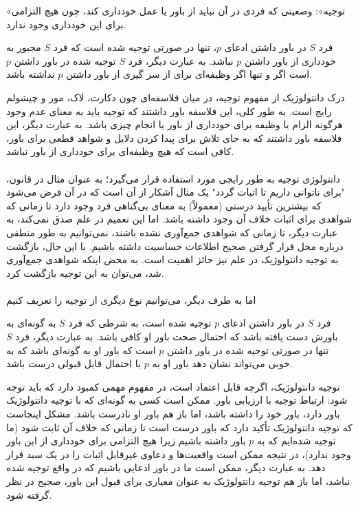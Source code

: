\documentclass[10pt,a4paper]{article}
\begin{document}
«توجیه»: وضعیتی که فردی در آن نباید از باور یا عمل خودداری کند، چون هیچ التزامی برای این خودداری وجود ندارد.
                    \begin{define}
                        فرد $S$ در باور داشتن ادعای $p$، تنها در صورتی توجیه شده است که فرد $S$ مجبور به خودداری از باور داشتن $p$ نباشد. به عبارت دیگر، فرد $S$ توجیه شده در باور داشتن $p$ است اگر و تنها اگر وظیفه‌ای برای از سر گیری از باور داشتن $p$ نداشته باشد.
                    \end{define}
                   درک دانتولوژیک از مفهوم توجیه، در میان فلاسفه‌ای چون دکارت، لاک، مور و چیشولم رایج است. به طور کلی، این فلاسفه باور داشتند که توجیه باید به معنای عدم وجود هرگونه الزام یا وظیفه برای خودداری از باور یا انجام چیزی باشد. به عبارت دیگر، این فلاسفه باور داشتند که به جای تلاش برای پیدا کردن دلایل و شواهد قطعی برای باور، کافی است که هیچ وظیفه‌ای برای خودداری از باور نباشد.
                    \\
                    \\
                   دانتولوژی توجیه به طور رایجی مورد استفاده قرار می‌گیرد؛ به عنوان مثال در قانون، "برای ناتوانی داریم تا اثبات گردد" یک مثال آشکار از آن است که در آن فرض می‌شود که بیشترین تأیید درستی (معمولاً) به معنای بی‌گناهی فرد وجود دارد تا زمانی که شواهدی برای اثبات خلاف آن وجود داشته باشد. اما این تعمیم در علم صدق نمی‌کند، به عبارت دیگر، تا زمانی که شواهدی جمع‌آوری نشده باشند، نمی‌توانیم به طور منطقی درباره محل قرار گرفتن صحیح اطلاعات حساسیت داشته باشیم. با این حال، بازگشت به توجیه دانتولوژیک در علم نیز حائز اهمیت است. به محض اینکه شواهدی جمع‌آوری شد، می‌توان به این توجیه بازگشت کرد.
                    \\
                    \\
                    اما به طرف دیگر، می‌توانیم نوع دیگری از توجیه را تعریف کنیم
                    \begin{define}
                        فرد $S$ در باور داشتن ادعای $p$ توجیه شده است، به شرطی که فرد $S$ به گونه‌ای به باورش دست یافته باشد که احتمال صحت باور او کافی باشد. به عبارت دیگر، فرد $S$ تنها در صورتی توجیه شده در باور داشتن $p$ است که باور او به گونه‌ای باشد که به خوبی می‌تواند نشان دهد باور او به $p$ با احتمال قابل قبولی درست باشد.
                    \end{define}
                    توجیه دانتولوژیک، اگرچه قابل اعتماد است، در مفهوم مهمی کمبود دارد که باید توجه شود: ارتباط توجیه با ارزیابی باور. ممکن است کسی به گونه‌ای که با توجیه دانتولوژیک باور دارد، باور خود را داشته باشد، اما باز هم باور او نادرست باشد. مشکل اینجاست که توجیه دانتولوژیک تأکید دارد که باور درست است تا زمانی که خلاف آن ثابت شود (ما توجیه شده‌ایم که به $p$ باور داشته باشیم زیرا هیچ التزامی برای خودداری از این باور وجود ندارد)، در نتیجه ممکن است واقعیت‌ها و دعاوی غیرقابل اثبات را در یک سبد قرار دهد. به عبارت دیگر، ممکن است ما در باور ادعایی باشیم که در واقع توجیه شده نباشد، اما باز هم توجیه دانتولوژیک به عنوان معیاری برای قبول این باور، صحیح در نظر گرفته شود.\cite{sep-epistemology}
\end{document}

